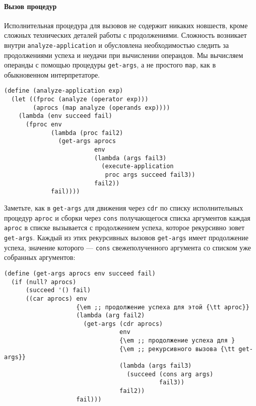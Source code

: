\paragraph{Вызов процедур}

Исполнительная процедура для вызовов не содержит никаких новшеств,
кроме сложных технических деталей работы с продолжениями.  Сложность
возникает внутри {\tt ana\-lyze-application} и обусловлена
необходимостью следить за продолжениями успеха и неудачи при вычислении
операндов.  Мы вычисляем операнды с помощью процедуры
{\tt get-args}, а не простого {\tt map}, как в
обыкновенном интерпретаторе.

\begin{Verbatim}[fontsize=\small]
(define (analyze-application exp)
  (let ((fproc (analyze (operator exp)))
        (aprocs (map analyze (operands exp))))
    (lambda (env succeed fail)
      (fproc env
             (lambda (proc fail2)
               (get-args aprocs
                         env
                         (lambda (args fail3)
                           (execute-application
                            proc args succeed fail3))
                         fail2))
             fail))))
\end{Verbatim}

Заметьте, как в {\tt get-args} для движения
через {\tt cdr} по списку исполнительных процедур
{\tt aproc} и сборки через {\tt cons} получающегося
списка аргументов  каждая
{\tt aproc} в списке вызывается с продолжением успеха, которое рекурсивно
зовет {\tt get-args}.  Каждый из этих рекурсивных вызовов
{\tt get-args} имеет продолжение успеха, значение которого ---
{\tt cons} свежеполученного аргумента со списком уже
собранных аргументов:

\begin{Verbatim}[fontsize=\small]
(define (get-args aprocs env succeed fail)
  (if (null? aprocs)
      (succeed '() fail)
      ((car aprocs) env
                    {\em ;; продолжение успеха для этой {\tt aproc}}
                    (lambda (arg fail2)
                      (get-args (cdr aprocs)
                                env
                                {\em ;; продолжение успеха для }
                                {\em ;; рекурсивного вызова {\tt get-args}}
                                (lambda (args fail3)
                                  (succeed (cons arg args)
                                           fail3))
                                fail2))
                    fail)))
\end{Verbatim}

